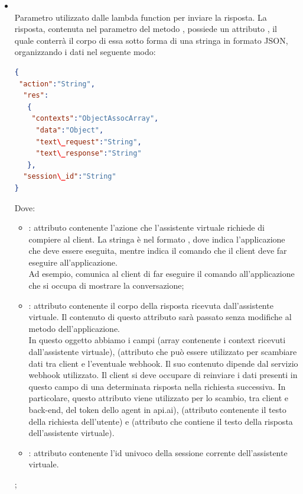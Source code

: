 \begin{itemize}
\begin{itemize}
\begin{itemize}
\begin{lstlisting}[language=json,firstnumber=1]
{
    "app":"nome\_applicazione",
    "query": "VAQuery"
}
\end{lstlisting}

con  stringa che corrisponde al nome dell'applicazione che manda la richiesta, e  oggetto del tipo  contenente i dati relativi alla query da mandare all'assistente virtuale;
			\item {} \\
			Parametro utilizzato dalle lambda function per inviare la risposta. La risposta, contenuta nel  parametro del metodo , possiede un attributo , il quale conterrà il corpo di essa sotto forma di una stringa in formato JSON, organizzando i dati nel seguente modo:
 \begin{lstlisting}[language=json,firstnumber=1]
{
 "action":"String",
  "res":
   {
    "contexts":"ObjectAssocArray",
     "data":"Object",
     "text\_request":"String",
     "text\_response":"String"
   },
  "session\_id":"String"
}
\end{lstlisting}
Dove:
\begin{itemize}
   \item {}: attributo contenente l'azione che l'assistente virtuale richiede di compiere al client. La stringa è nel formato , dove  indica l'applicazione che deve essere   eseguita, mentre  indica il comando che il client deve far eseguire all'applicazione. \\ Ad esempio,  comunica al client di far eseguire il comando  all'applicazione che si occupa di mostrare la conversazione;
   \item {}: attributo contenente il corpo della risposta ricevuta dall'assistente virtuale. Il contenuto di questo attributo sarà passato senza modifiche al metodo  dell'applicazione.\\ In questo oggetto abbiamo i campi  (array contenente i context ricevuti dall'assistente virtuale),  (attributo che può essere utilizzato per scambiare dati tra client e l'eventuale webhook. Il suo contenuto dipende dal servizio webhook utilizzato. Il client si deve occupare di reinviare i dati presenti in questo campo  di una determinata risposta nella richiesta successiva. In particolare, questo attributo viene utilizzato per lo scambio, tra client e back-end, del token dello agent in api.ai),  (attributo contenente il testo della richiesta dell'utente) e (attributo che contiene il testo della risposta dell'assistente virtuale).
   \item {}: attributo contenente l'id univoco della sessione corrente dell'assistente virtuale.
\end{itemize}
;
		\end{itemize}
	\end{itemize}
\end{itemize}
